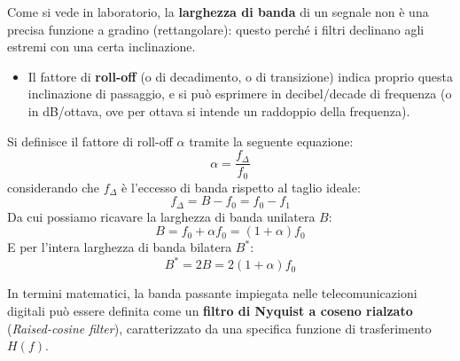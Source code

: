 \documentclass[openany,a4paper,12pt]{book}
\begin{document}
Come si vede in laboratorio, la \textbf{larghezza di banda} di un segnale non è una precisa funzione a gradino (rettangolare): questo perché i filtri declinano agli estremi con una certa inclinazione.
\begin{itemize}[label=\textcolor{PoliBlue}{\textbullet}]
    \item Il fattore di \textbf{roll-off} (o di decadimento, o di transizione) indica proprio questa inclinazione di passaggio, e si può esprimere in decibel/decade di frequenza (o in dB/ottava, ove per ottava si intende un raddoppio della frequenza).
\end{itemize}

Si definisce il fattore di roll-off $\alpha$ tramite la seguente equazione:
\begin{equation}
    \alpha = \frac{f_\Delta}{f_0}
\end{equation}
considerando che $f_\Delta$ è l'eccesso di banda rispetto al taglio ideale:
\begin{equation}
    f_\Delta = B - f_0 = f_0 - f_1
\end{equation}
Da cui possiamo ricavare la larghezza di banda unilatera $B$:
\begin{equation}
    B = f_0 + \alpha f_0 = (1 + \alpha)f_0
\end{equation}
E per l'intera larghezza di banda bilatera $B^*$:
\begin{equation}
    B^* = 2B = 2(1 + \alpha)f_0
\end{equation}

In termini matematici, la banda passante impiegata nelle telecomunicazioni digitali può essere definita come un \textbf{filtro di Nyquist a coseno rialzato} (\textit{Raised-cosine filter}), caratterizzato da una specifica funzione di trasferimento $H(f)$.

\vspace{0.5cm}
\end{document}
